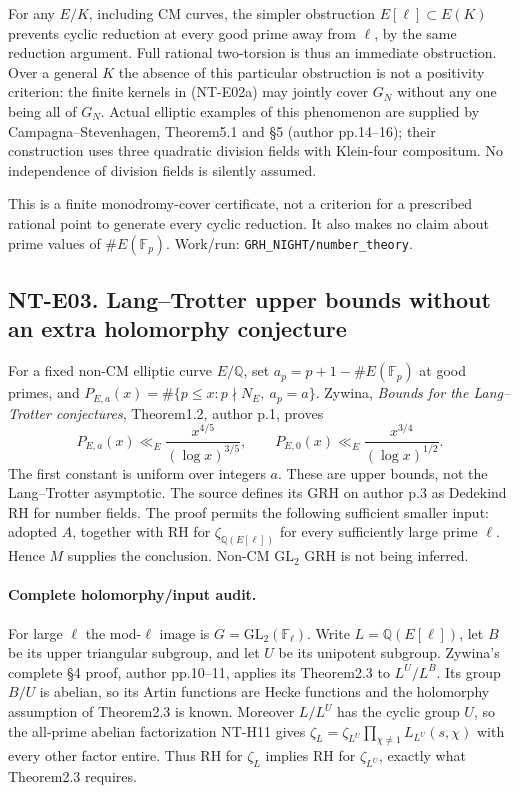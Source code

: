 For any $E/K$, including CM curves, the simpler obstruction
$E[\ell]\subset E(K)$ prevents cyclic reduction at every good prime
away from $\ell$, by the same reduction argument. Full rational
two-torsion is thus an immediate obstruction. Over a general $K$
the absence of this particular obstruction is not a positivity
criterion: the finite kernels in (NT-E02a) may jointly cover $G_N$
without any one being all of $G_N$. Actual elliptic examples of this
phenomenon are supplied by Campagna--Stevenhagen, Theorem5.1 and
\S5 (author pp.14--16); their construction uses three quadratic
division fields with Klein-four compositum. No independence of
division fields is silently assumed.

This is a finite monodromy-cover certificate, not a criterion for
a prescribed rational point to generate every cyclic reduction.
It also makes no claim about prime values of $\#E(\mathbb F_p)$.
Work/run: \texttt{GRH\_NIGHT/number\_theory}.

\subsection*{NT-E03. Lang--Trotter upper bounds without an extra holomorphy conjecture}
For a fixed non-CM elliptic curve $E/\mathbb Q$, set
$a_p=p+1-\#E(\mathbb F_p)$ at good primes, and
$P_{E,a}(x)=\#\{p\le x:p\nmid N_E,\ a_p=a\}$.
Zywina, \emph{Bounds for the Lang--Trotter conjectures},
Theorem1.2, author p.1, proves
\[
 P_{E,a}(x)\ll_E\frac{x^{4/5}}{(\log x)^{3/5}},\qquad
 P_{E,0}(x)\ll_E\frac{x^{3/4}}{(\log x)^{1/2}}.            \tag{NT-E03a}
\]
The first constant is uniform over integers $a$. These are upper
bounds, not the Lang--Trotter asymptotic. The source defines its GRH
on author p.3 as Dedekind RH for number fields. The proof permits the
following sufficient smaller input: adopted $A$, together with RH
for $\zeta_{\mathbb Q(E[\ell])}$ for every sufficiently large prime
$\ell$. Hence $M$ supplies the conclusion. Non-CM $\mathrm{GL}_2$
GRH is not being inferred.

\paragraph{Complete holomorphy/input audit.}
For large $\ell$ the mod-$\ell$ image is $G=\mathrm{GL}_2(\mathbb F_\ell)$.
Write $L=\mathbb Q(E[\ell])$, let $B$ be its upper triangular
subgroup, and let $U$ be its unipotent subgroup. Zywina's complete
\S4 proof, author pp.10--11, applies its Theorem2.3 to
$L^U/L^B$. Its group $B/U$ is abelian, so its Artin functions are
Hecke functions and the holomorphy assumption of Theorem2.3 is
known. Moreover $L/L^U$ has the cyclic group $U$, so the all-prime
abelian factorization NT-H11 gives
$\zeta_L=\zeta_{L^U}\prod_{\chi\ne1}L_{L^U}(s,\chi)$ with every
other factor entire. Thus RH for $\zeta_L$ implies RH for
$\zeta_{L^U}$, exactly what Theorem2.3 requires.

